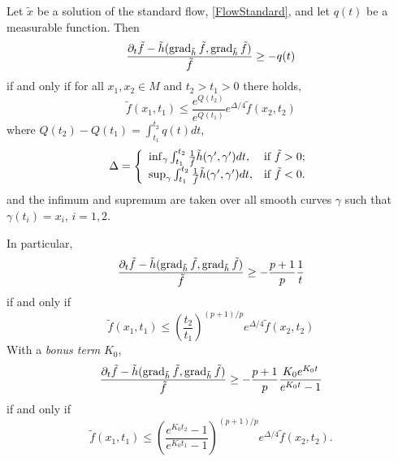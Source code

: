 \begin{thm}
Let $\tilde{x}$ be a solution of the standard flow, \eqref{FlowStandard}, and let $q(t)$ be a measurable function. Then
\begin{equation}
\label{eq:liyauhamilton_harnack}
\frac{\partial_t\tilde{f} - \tilde{h}(\operatorname{grad}_{\tilde{h}} \tilde{f}, \operatorname{grad}_{\tilde{h}} \tilde{f})}{\tilde{f}} \geq -q(t)
\end{equation}
if and only if for all $x_1, x_2 \in M$ and $t_2 > t_1 > 0$ there holds,
\begin{equation}
\label{eq:moser_harnack}
\tilde{f} (x_1, t_1) \leq \frac{e^{Q(t_2)}}{e^{Q(t_1)}} e^{\Delta/4} \tilde{f} (x_2, t_2)
\end{equation}
where $Q(t_2) - Q(t_1) = \int_{t_1}^{t_2} q(t) dt$,
\[
\Delta = \left\{
           \begin{array}{ll}
             \inf_{\gamma} \int_{t_1}^{t_2} \frac{1}{\tilde{f}} \tilde{h}(\gamma', \gamma') dt, & \hbox{if}~ \tilde{f}>0; \\
             \sup_{\gamma} \int_{t_1}^{t_2} \frac{1}{\tilde{f}} \tilde{h}(\gamma', \gamma') dt, & \hbox{if}~ \tilde{f}<0.
           \end{array}
         \right.
\]
and the infimum and supremum are taken over all smooth curves $\gamma$ such that $\gamma(t_i) = x_i$, $i = 1,2$.

In particular,
\[
\frac{\partial_t\tilde{f} - \tilde{h}(\operatorname{grad}_{\tilde{h}} \tilde{f}, \operatorname{grad}_{\tilde{h}} \tilde{f})}{\tilde{f}} \geq - \frac{p+1}{p} \frac{1}{t}
\]
if and only if
\[
\tilde{f} (x_1, t_1) \leq \left(\frac{t_2}{t_1}\right)^{(p+1)/p} e^{\Delta/4} \tilde{f} (x_2, t_2)
\]
With a \emph{bonus term} $K_0$,
\[
\frac{\partial_t\tilde{f} - \tilde{h}(\operatorname{grad}_{\tilde{h}} \tilde{f}, \operatorname{grad}_{\tilde{h}} \tilde{f})}{\tilde{f}} \geq - \frac{p+1}{p} \frac{K_0 e^{K_0 t}}{e^{K_0 t} - 1}
\]
if and only if
\[
\tilde{f} (x_1, t_1) \leq \left(\frac{e^{K_0 t_2} - 1}{e^{K_0 t_1} - 1}\right)^{(p+1)/p} e^{\Delta/4} \tilde{f} (x_2, t_2).
\]
\end{thm}

